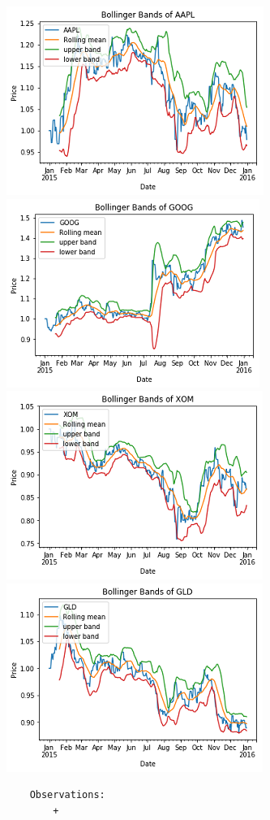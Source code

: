 \documentclass[11pt]{article}
\makeatletter
\def\maxwidth{\ifdim\Gin@nat@width>\linewidth\linewidth
    \else\Gin@nat@width\fi}
\let\Oldincludegraphics\includegraphics
\renewcommand{\includegraphics}[1]{\Oldincludegraphics[width=.8\maxwidth]{#1}}
\makeatother
\begin{document}
\includegraphics{./figures/4.jpg} \includegraphics{./figures/5.jpg}
\includegraphics{./figures/6.jpg} \includegraphics{./figures/7.jpg}

\begin{verbatim}
    Observations:
        + 
\end{verbatim}
\end{document}

